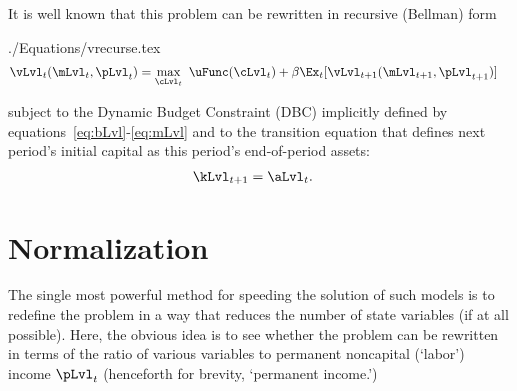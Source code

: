 \documentclass[titlepage, headings=optiontotocandhead]{\econtex}
\begin{document}
It is well known that this problem can be rewritten in recursive (Bellman) form
\begin{verbatimwrite}{./Equations/vrecurse.tex}
  \begin{equation}\begin{gathered}\begin{aligned}
        {\vLvl}
_{t}(\mLvl_{t},\pLvl_{t})  & = \max_{\cLvl_{t}}~ \uFunc(\cLvl_{t}) + {\DiscAlt}\Ex_{t}[ {\vLvl}
_{t+1}({\mLvl}_{t+1},\pLvl_{t+1})]\label{eq:vrecurse}
      \end{aligned}\end{gathered}\end{equation}
\end{verbatimwrite}
\unskip
subject to the Dynamic Budget Constraint (DBC) implicitly defined by equations~\eqref{eq:bLvl}-\eqref{eq:mLvl}
and to the transition equation that defines next period's initial capital as this period's end-of-period assets:
\begin{equation}\begin{gathered}\begin{aligned}
      \kLvl_{t+1} & = \aLvl_{t}. \label{eq:transition.state}
\end{aligned}\end{gathered}\end{equation}

\hypertarget{Normalization}{}
\section{Normalization}\label{sec:normalization}
 The single most powerful method for speeding the solution of such models is to redefine the problem in a way that reduces the number of state variables (if at all possible).  Here, the obvious idea is to see whether the problem can be rewritten in terms of the ratio of various variables to permanent noncapital (`labor') income $\pLvl_{t}$ (henceforth for brevity, `permanent income.')
\end{document}
